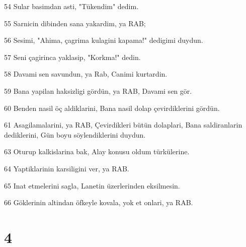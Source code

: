 \par 54 Sular basimdan asti, "Tükendim" dedim.
\par 55 Sarnicin dibinden sana yakardim, ya RAB;
\par 56 Sesimi, "Ahima, çagrima kulagini kapama!" dedigimi duydun.
\par 57 Seni çagirinca yaklasip, "Korkma!" dedin.
\par 58 Davami sen savundun, ya Rab, Canimi kurtardin.
\par 59 Bana yapilan haksizligi gördün, ya RAB, Davami sen gör.
\par 60 Benden nasil öç aldiklarini, Bana nasil dolap çevirdiklerini gördün.
\par 61 Asagilamalarini, ya RAB, Çevirdikleri bütün dolaplari, Bana saldiranlarin dediklerini, Gün boyu söylendiklerini duydun.
\par 63 Oturup kalkislarina bak, Alay konusu oldum türkülerine.
\par 64 Yaptiklarinin karsiligini ver, ya RAB.
\par 65 Inat etmelerini sagla, Lanetin üzerlerinden eksilmesin.
\par 66 Göklerinin altindan öfkeyle kovala, yok et onlari, ya RAB.

\chapter{4}

